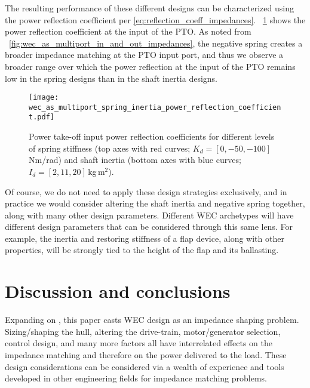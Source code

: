 \documentclass[5p,times]{elsarticle}
\begin{document}
The resulting performance of these different designs can be characterized using the power reflection coefficient per \eqref{eq:reflection_coeff_impedances}.
\figurename~\ref{wec_as_multiport_spring_inertia_power_reflection_coefficient} shows the power reflection coefficient at the input of the PTO.
As noted from \figurename~\ref{fig:wec_as_multiport_in_and_out_impedances}, the negative spring creates a broader impedance matching at the PTO input port, and thus we observe a broader range over which the power reflection at the input of the PTO  remains low in the spring designs than in the shaft inertia designs.

\begin{figure}[tb]
        \centering
        \texttt{[image: wec\_as\_multiport\_spring\_inertia\_power\_reflection\_coefficient.pdf]}
        \caption{Power take-off input power reflection coefficients for different levels of spring stiffness (top axes with red curves; $K_d=[0, -50, -100]$\,Nm/rad) and shaft inertia (bottom axes with blue curves; $I_d=[2, 11, 20]$\,kg\,m$^2$).}
        \label{wec_as_multiport_spring_inertia_power_reflection_coefficient}
\end{figure}

Of course, we do not need to apply these design strategies exclusively, and in practice we would consider altering the shaft inertia and negative spring together, along with many other design parameters.
Different WEC archetypes will have different design parameters that can be considered through this same lens.
For example, the inertia and restoring stiffness of a flap device, along with other properties, will be strongly tied to the height of the flap and its ballasting.

\section{Discussion and conclusions}
Expanding on \cite{Bacelli:2021aa}, this paper casts WEC design as an impedance shaping problem.
Sizing/shaping the hull, altering the drive-train, motor/generator selection, control design, and many more factors all have interrelated effects on the impedance matching and therefore on the power delivered to the load.
These design considerations can be considered via a wealth of experience and tools developed in other engineering fields for impedance matching problems.
\end{document}
